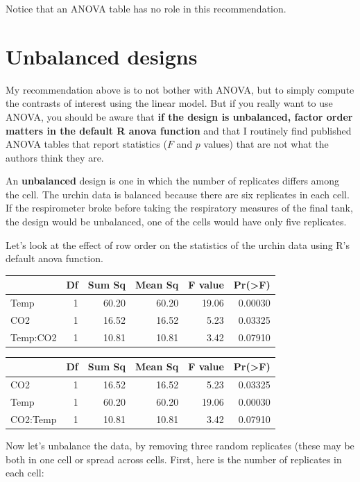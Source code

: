 \documentclass[]{book}
\begin{document}
Notice that an ANOVA table has no role in this recommendation.

\section{Unbalanced designs}\label{unbalanced-designs}

My recommendation above is to not bother with ANOVA, but to simply
compute the contrasts of interest using the linear model. But if you
really want to use ANOVA, you should be aware that \textbf{if the design
is unbalanced, factor order matters in the default R anova function} and
that I routinely find published ANOVA tables that report statistics
(\(F\) and \(p\) values) that are not what the authors think they are.

An \textbf{unbalanced} design is one in which the number of replicates
differs among the cell. The urchin data is balanced because there are
six replicates in each cell. If the respirometer broke before taking the
respiratory measures of the final tank, the design would be unbalanced,
one of the cells would have only five replicates.

Let's look at the effect of row order on the statistics of the urchin
data using R's default anova function.

\begin{tabular}{l|r|r|r|r|r}
\hline
  & Df & Sum Sq & Mean Sq & F value & Pr(>F)\\
\hline
Temp & 1 & 60.20 & 60.20 & 19.06 & 0.00030\\
\hline
CO2 & 1 & 16.52 & 16.52 & 5.23 & 0.03325\\
\hline
Temp:CO2 & 1 & 10.81 & 10.81 & 3.42 & 0.07910\\
\hline
\end{tabular}

\begin{tabular}{l|r|r|r|r|r}
\hline
  & Df & Sum Sq & Mean Sq & F value & Pr(>F)\\
\hline
CO2 & 1 & 16.52 & 16.52 & 5.23 & 0.03325\\
\hline
Temp & 1 & 60.20 & 60.20 & 19.06 & 0.00030\\
\hline
CO2:Temp & 1 & 10.81 & 10.81 & 3.42 & 0.07910\\
\hline
\end{tabular}

Now let's unbalance the data, by removing three random replicates (these
may be both in one cell or spread across cells. First, here is the
number of replicates in each cell:
\end{document}
